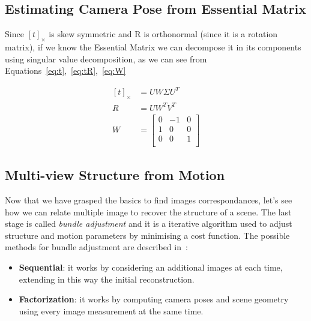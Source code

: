  \subsection{Estimating Camera Pose from Essential Matrix}
 Since  $ \left[ t\right]_{\times} $ is skew symmetric and R is orthonormal (since 
it is a rotation matrix), if we know the Essential Matrix we can decompose it
in its components using singular value decomposition, as we can see from Equations~\ref{eq:t},~\ref{eq:tR},~\ref{eq:W}

%
\begin{align}
    \left[ t\right]_{\times} &=  U W \Sigma U^T \label{eq:t}\\
    R &= U W^T V^T  \label{eq:tR}\\
    W&=
    \begin{bmatrix}
      0 & -1& 0 \\
      1 & 0 & 0 \\
      0 & 0 & 1     \\
    \end{bmatrix}\label{eq:W}
\end{align}


\subsection{Multi-view Structure from Motion}
Now that we have grasped the basics to find images correspondances, let's see how we can relate multiple image to recover the structure of a scene.
The last stage is called \textit{bundle adjustment} and it is a iterative algorithm used to adjust structure and motion parameters by minimising a cost function.
The possible methods for bundle adjustment are described in~\cite{bundle}: 
\begin{itemize}
    \item \textbf{Sequential}: it works by considering an additional images at each time, extending in this way the initial reconstruction.
    \item \textbf{Factorization}: it works by computing camera poses and scene geometry using every image measurement at the same time.
\end{itemize}


